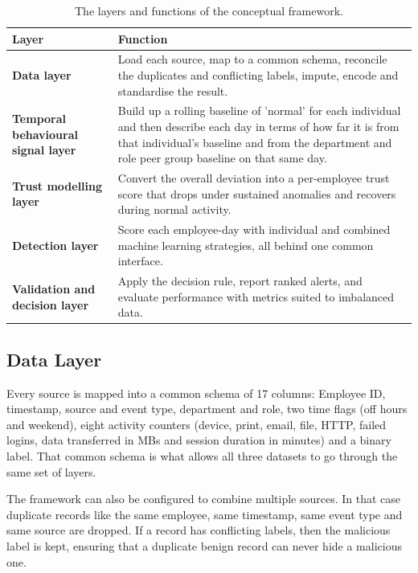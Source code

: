 \documentclass[a4paper,12pt]{article}
\begin{document}
\begin{table}[H]
\centering
\renewcommand{\arraystretch}{1.4}
\begin{tabular}{>{\bfseries}p{3.6cm} p{9.2cm}}
\toprule
Layer & Function \\
\midrule
Data layer & Load each source, map to a common schema, reconcile the duplicates and conflicting labels, impute, encode and standardise the result. \\
Temporal behavioural signal layer & Build up a rolling baseline of 'normal' for each individual and then describe each day in terms of how far it is from that individual's baseline and from the department and role peer group baseline on that same day. \\
Trust modelling layer & Convert the overall deviation into a per-employee trust score that drops under sustained anomalies and recovers during normal activity. \\
Detection layer & Score each employee-day with individual and combined machine learning strategies, all behind one common interface. \\
Validation and decision layer & Apply the decision rule, report ranked alerts, and evaluate performance with metrics suited to imbalanced data. \\
\bottomrule
\end{tabular}
\caption{The layers and functions of the conceptual framework.}
\label{tab:framework}
\end{table}

\subsection{Data Layer}
\label{sec:6.2}

Every source is mapped into a common schema of 17 columns: Employee ID, timestamp, source and event type, department and role, two time flags (off hours and weekend), eight activity counters (device, print, email, file, HTTP, failed logins, data transferred in MBs and session duration in minutes) and a binary label. That common schema is what allows all three datasets to go through the same set of layers.

The framework can also be configured to combine multiple sources. In that case duplicate records like the same employee, same timestamp, same event type and same source are dropped. If a record has conflicting labels, then the malicious label is kept, ensuring that a duplicate benign record can never hide a malicious one.
\end{document}
